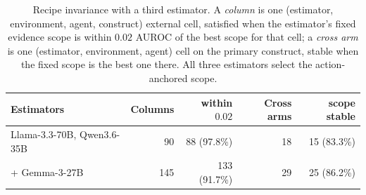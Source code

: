 \begin{table}[t]
\centering
\small
\caption{Recipe invariance with a third estimator. A \emph{column} is one (estimator, environment, agent, construct) external cell, satisfied when the estimator's fixed evidence scope is within $0.02$ AUROC of the best scope for that cell; a \emph{cross arm} is one (estimator, environment, agent) cell on the primary construct, stable when the fixed scope is the best one there. All three estimators select the action-anchored scope.}
\label{tab:recipe}
\begin{tabular}{lrrrr}
\toprule
Estimators & Columns & within $0.02$ & Cross arms & scope stable \\
\midrule
Llama-3.3-70B, Qwen3.6-35B & 90 & 88 (97.8\%) & 18 & 15 (83.3\%) \\
{}+ Gemma-3-27B & 145 & 133 (91.7\%) & 29 & 25 (86.2\%) \\
\bottomrule
\end{tabular}
\end{table}

